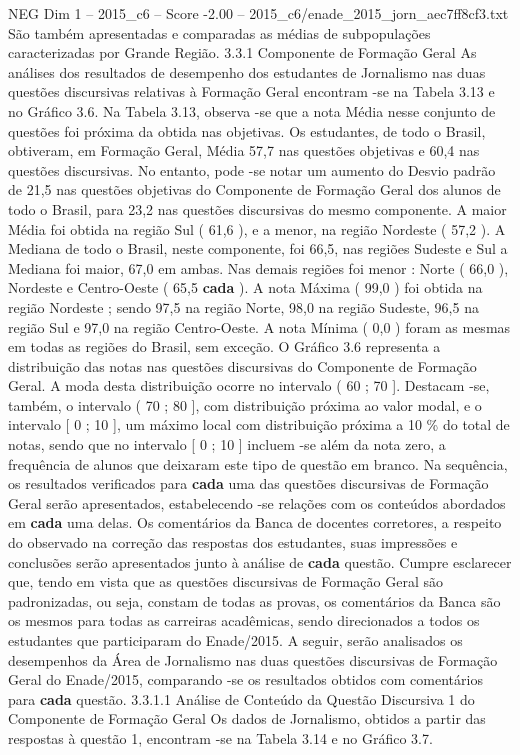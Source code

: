 \begin{textsample}{NEG Dim 1 – 2015\_c6 – Score -2.00 – 2015\_c6/enade\_2015\_jorn\_aec7ff8cf3.txt}
São também apresentadas e comparadas as médias de subpopulações caracterizadas por Grande Região. 3.3.1 Componente de Formação Geral As análises dos resultados de desempenho dos estudantes de Jornalismo nas duas questões discursivas relativas à Formação Geral encontram -se na Tabela 3.13 e no Gráfico 3.6.
Na Tabela 3.13, observa -se que a nota Média nesse conjunto de questões foi próxima da obtida nas objetivas.
Os estudantes, de todo o Brasil, obtiveram, em Formação Geral, Média 57,7 nas questões objetivas e 60,4 nas questões discursivas.
No entanto, pode -se notar um aumento do Desvio padrão de 21,5 nas questões objetivas do Componente de Formação Geral dos alunos de todo o Brasil, para 23,2 nas questões discursivas do mesmo componente.
A maior Média foi obtida na região Sul ( 61,6 ), e a menor, na região Nordeste ( 57,2 ).
A Mediana de todo o Brasil, neste componente, foi 66,5, nas regiões Sudeste e Sul a Mediana foi maior, 67,0 em ambas.
Nas demais regiões foi menor : Norte ( 66,0 ), Nordeste e Centro-Oeste ( 65,5 \textbf{cada} ).
A nota Máxima ( 99,0 ) foi obtida na região Nordeste ; sendo 97,5 na região Norte, 98,0 na região Sudeste, 96,5 na região Sul e 97,0 na região Centro-Oeste.
A nota Mínima ( 0,0 ) foram as mesmas em todas as regiões do Brasil, sem exceção.
O Gráfico 3.6 representa a distribuição das notas nas questões discursivas do Componente de Formação Geral.
A moda desta distribuição ocorre no intervalo ( 60 ; 70 ].
Destacam -se, também, o intervalo ( 70 ; 80 ], com distribuição próxima ao valor modal, e o intervalo [ 0 ; 10 ], um máximo local com distribuição próxima a 10 \% do total de notas, sendo que no intervalo [ 0 ; 10 ] incluem -se além da nota zero, a frequência de alunos que deixaram este tipo de questão em branco.
Na sequência, os resultados verificados para \textbf{cada} uma das questões discursivas de Formação Geral serão apresentados, estabelecendo -se relações com os conteúdos abordados em \textbf{cada} uma delas.
Os comentários da Banca de docentes corretores, a respeito do observado na correção das respostas dos estudantes, suas impressões e conclusões serão apresentados junto à análise de \textbf{cada} questão.
Cumpre esclarecer que, tendo em vista que as questões discursivas de Formação Geral são padronizadas, ou seja, constam de todas as provas, os comentários da Banca são os mesmos para todas as carreiras acadêmicas, sendo direcionados a todos os estudantes que participaram do Enade/2015.
A seguir, serão analisados os desempenhos da Área de Jornalismo nas duas questões discursivas de Formação Geral do Enade/2015, comparando -se os resultados obtidos com comentários para \textbf{cada} questão. 3.3.1.1 Análise de Conteúdo da Questão Discursiva 1 do Componente de Formação Geral Os dados de Jornalismo, obtidos a partir das respostas à questão 1, encontram -se na Tabela 3.14 e no Gráfico 3.7.

\end{textsample}
